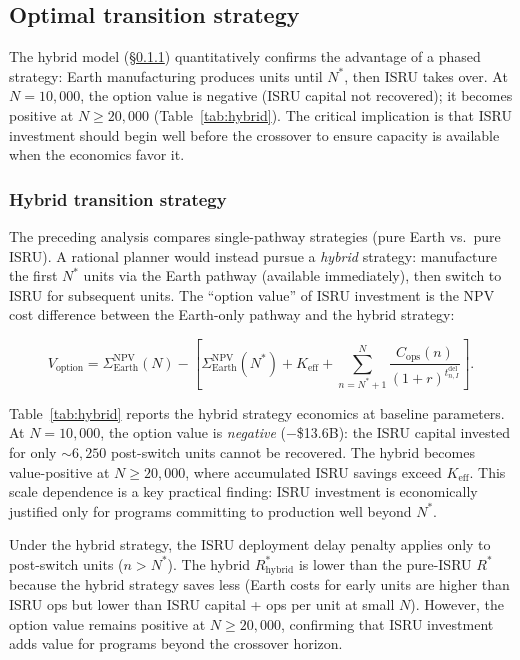 \subsection{Optimal transition strategy}

The hybrid model (\S\ref{sec:hybrid}) quantitatively confirms the advantage of a phased strategy: Earth manufacturing produces units until $N^*$, then ISRU takes over. At $N = 10{,}000$, the option value is negative (ISRU capital not recovered); it becomes positive at $N \geq 20{,}000$ (Table~\ref{tab:hybrid}). The critical implication is that ISRU investment should begin well before the crossover to ensure capacity is available when the economics favor it.

\subsubsection{Hybrid transition strategy}
\label{sec:hybrid}

The preceding analysis compares single-pathway strategies (pure Earth vs.\ pure ISRU). A rational planner would instead pursue a \emph{hybrid} strategy: manufacture the first $N^*$ units via the Earth pathway (available immediately), then switch to ISRU for subsequent units. The ``option value'' of ISRU investment is the NPV cost difference between the Earth-only pathway and the hybrid strategy:

\begin{equation}
  V_{\mathrm{option}} = \Sigma_{\mathrm{Earth}}^{\mathrm{NPV}}(N) - \left[\Sigma_{\mathrm{Earth}}^{\mathrm{NPV}}(N^*) + K_{\mathrm{eff}} + \sum_{n=N^*+1}^{N} \frac{C_{\mathrm{ops}}(n)}{(1+r)^{t_{n,I}^{\mathrm{del}}}}\right].
  \label{eq:hybrid}
\end{equation}

Table~\ref{tab:hybrid} reports the hybrid strategy economics at baseline parameters. At $N = 10{,}000$, the option value is \emph{negative} ($-$\$13.6B): the ISRU capital invested for only ${\sim}6{,}250$ post-switch units cannot be recovered. The hybrid becomes value-positive at $N \geq 20{,}000$, where accumulated ISRU savings exceed $K_{\mathrm{eff}}$. This scale dependence is a key practical finding: ISRU investment is economically justified only for programs committing to production well beyond $N^*$.



Under the hybrid strategy, the ISRU deployment delay penalty applies only to post-switch units ($n > N^*$). The hybrid $R^*_{\mathrm{hybrid}}$ is lower than the pure-ISRU $R^*$ because the hybrid strategy saves less (Earth costs for early units are higher than ISRU ops but lower than ISRU capital + ops per unit at small $N$). However, the option value remains positive at $N \geq 20{,}000$, confirming that ISRU investment adds value for programs beyond the crossover horizon.

